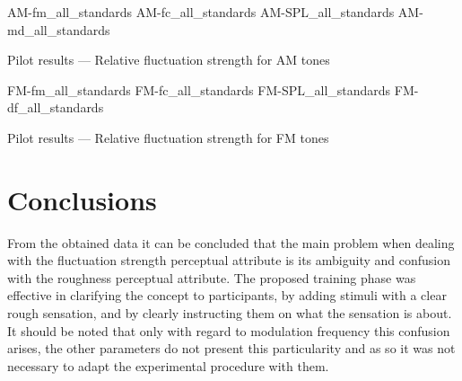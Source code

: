 \documentclass[../main.tex]{subfiles}
\begin{document}
\begin{pilotresults}

\myfigurequad%
  {AM-fm_all_standards}
  {AM-fc_all_standards}
  {AM-SPL_all_standards}
  {AM-md_all_standards}
  {
    \caption{Pilot results --- Relative fluctuation strength for AM tones}
    \label{fig:pilot_AM_all_comparison}
  }

\myfigurequad%
  {FM-fm_all_standards}
  {FM-fc_all_standards}
  {FM-SPL_all_standards}
  {FM-df_all_standards}
  {
    \caption{Pilot results --- Relative fluctuation strength for FM tones}
    \label{fig:pilot_FM_all_comparison}
  }

\end{pilotresults}

\section{Conclusions}

From the obtained data it can be concluded that the main problem when dealing
with the fluctuation strength perceptual attribute is its ambiguity and
confusion with the roughness perceptual attribute. The proposed training phase
was effective in clarifying the concept to participants, by adding stimuli with
a clear rough sensation, and by clearly instructing them on what the sensation
is about. It should be noted that only with regard to modulation frequency this
confusion arises, the other parameters do not present this particularity and as
so it was not necessary to adapt the experimental procedure with them.
\end{document}
